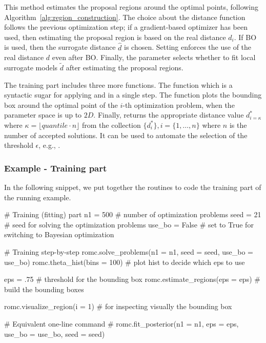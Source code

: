\documentclass[article, shortnames]{jss}
\begin{document}
\noindent
This method estimates the proposal regions around the optimal points,
following Algorithm~\ref{alg:region_construction}. The choice about
the distance function follows the previous optimization step; if a
gradient-based optimizer has been used, then estimating the proposal
region is based on the real distance \(d_i\). If BO is used, then the
surrogate distance \(\hat{d}\) is chosen. Setting
 enforces the use of the real distance \(d\)
even after BO. Finally, the parameter  selects
whether to fit local surrogate models \(\tilde{d}\) after estimating
the proposal regions.

\noindent
The training part includes three more functions. The function
 which is a syntactic sugar for
applying  and  in a
single step. The function  plots the
bounding box around the optimal point of the \(i\)-th optimization
problem, when the parameter space is up to \(2D\). Finally,
 returns the appropriate distance
value \(d_{i=\kappa}^*\) where
\(\kappa = \lfloor quantile \cdot n \rfloor\) from the collection
\(\{ d_i^* \}, i = \{1, \ldots, n\}\) where \(n\) is the number
of accepted solutions. It can be used to automate the selection of the
threshold \(\epsilon\), e.g.,
.


\subsubsection*{Example - Training part}


In the following snippet, we put together the routines to code the
training part of the running example.

\begin{Code}
# Training (fitting) part
n1 = 500 # number of optimization problems
seed = 21 # seed for solving the optimization problems
use_bo = False # set to True for switching to Bayesian optimization

# Training step-by-step
romc.solve_problems(n1 = n1, seed = seed, use_bo = use_bo)
romc.theta_hist(bins = 100) # plot hist to decide which eps to use

eps = .75 # threshold for the bounding box
romc.estimate_regions(eps = eps) # build the bounding boxes

romc.visualize_region(i = 1) # for inspecting visually the bounding box

# Equivalent one-line command
# romc.fit_posterior(n1 = n1, eps = eps, use_bo = use_bo, seed = seed)
\end{Code}
\end{document}
